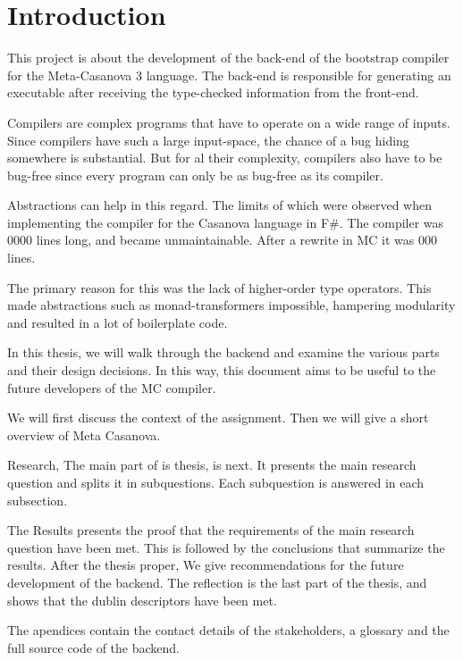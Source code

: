 \section{Introduction}
This project is about the development of the back-end of the bootstrap compiler for the Meta-Casanova 3 language.
The back-end is responsible for generating an executable after receiving the type-checked information from the front-end.

Compilers are complex programs that have to operate on a wide range of inputs.
Since compilers have such a large input-space, the chance of a bug hiding somewhere is substantial. 
But for al their complexity, compilers also have to be bug-free since every program can only be as bug-free as its compiler.

Abstractions can help in this regard.
The limits of which were observed when implementing the compiler for the Casanova language in F\#.
The compiler was 0000 lines long, and became unmaintainable.
After a rewrite in MC it was 000 lines\cite{maggiore}.

The primary reason for this was the lack of higher-order type operators.
This made abstractions such as monad-transformers impossible, hampering modularity and resulted in a lot of boilerplate code.

In this thesis, we will walk through the backend and examine the various parts and their design decisions.
In this way, this document aims to be useful to the future developers of the MC compiler.

We will first discuss the context of the assignment.
Then we will give a short overview of Meta Casanova.

Research, The main part of is thesis, is next.
It presents the main research question and splits it in subquestions.
Each subquestion is answered in each subsection.

The Results presents the proof that the requirements of the main research question have been met.
This is followed by the conclusions that summarize the results.
After the thesis proper, We give recommendations for the future development of the backend.
The reflection is the last part of the thesis, and shows that the dublin descriptors have been met.

The apendices contain the contact details of the stakeholders, a glossary and the full source code of the backend.




